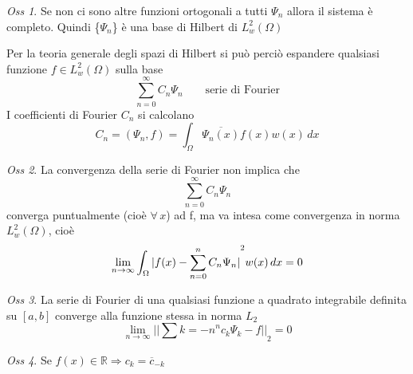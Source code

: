 \documentclass[a4paper,11pt]{report}
\theoremstyle{remark}
\newtheorem*{oss}{Oss}
\theoremstyle{definition}
\newcommand{\R}{\mathbb{R}}
\DeclarePairedDelimiter{\abs}{\lvert}{\rvert}
\begin{document}
\begin{oss}
	Se non ci sono altre funzioni ortogonali a tutti $\Psi_n$ allora il sistema è completo. Quindi \{$\Psi_n$\} è una base di Hilbert di $L^2_w(\Omega)$
\end{oss}

\noindent Per la teoria generale degli spazi di Hilbert si può perciò espandere qualsiasi funzione $f\in L^2_w(\Omega)$ sulla base 
\begin{equation*}
	\sum_{n=0}^\infty C_n \Psi_n \qquad \text{serie di Fourier}
\end{equation*}
I coefficienti di Fourier $C_n$ si calcolano
\begin{equation*}
	C_n = (\Psi_n,f) = \int_\Omega \overline{\Psi_n(x)}f(x)w(x) \, dx 
\end{equation*}

\begin{oss}
	La convergenza della serie di Fourier non implica che 
	\begin{equation*}
		\sum_{n=0}^\infty C_n\Psi_n
	\end{equation*}
	converga puntualmente (cioè $\forall \, x$) ad f, ma va intesa come convergenza in norma $L^2_w(\Omega)$, cioè
	\begin{equation*}
		\lim_{n\to\infty} \int_\Omega {\abs{f(x) - \sum_{n=0}^n C_n\Psi_n}}^2 w(x) \, dx =0
	\end{equation*}
\end{oss}

\begin{oss}
	La serie di Fourier di una qualsiasi funzione a quadrato integrabile definita su $[a,b]$ converge alla funzione stessa in norma $L_2$
	\begin{equation*}
		\lim_{n\to\infty} {||\sum{k=-n}^n c_k \Psi_k - f||}_2 =0
	\end{equation*}
\end{oss}

\begin{oss}
	Se $f(x)\in\R \Rightarrow c_k = \overline{c}_{-k}$
\end{oss}
\end{document}

